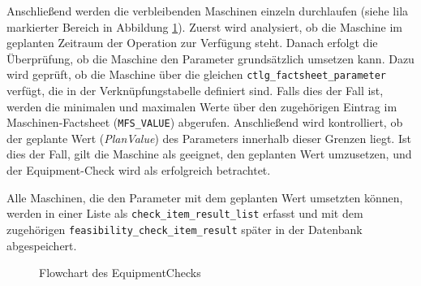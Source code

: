 Anschließend werden die verbleibenden Maschinen einzeln durchlaufen (siehe lila markierter Bereich in Abbildung \ref{fig:equipment-check}). Zuerst wird analysiert, ob die Maschine im geplanten Zeitraum der Operation zur Verfügung steht. Danach erfolgt die Überprüfung, ob die Maschine den Parameter grundsätzlich umsetzen kann. Dazu wird geprüft, ob die Maschine über die gleichen \texttt{ctlg\_factsheet\_parameter} verfügt, die in der Verknüpfungstabelle definiert sind. Falls dies der Fall ist, werden die minimalen und maximalen Werte über den zugehörigen Eintrag im Maschinen-Factsheet (\texttt{MFS\_VALUE}) abgerufen. Anschließend wird kontrolliert, ob der geplante Wert (\textit{PlanValue}) des Parameters innerhalb dieser Grenzen liegt. Ist dies der Fall, gilt die Maschine als geeignet, den geplanten Wert umzusetzen, und der Equipment-Check wird als erfolgreich betrachtet.

Alle Maschinen, die den Parameter mit dem geplanten Wert umsetzten können, werden in einer Liste als \texttt{check\_item\_result\_list} erfasst und mit dem zugehörigen \texttt{feasibility\_check\_item\_result} später in der Datenbank abgespeichert. 

\begin{figure}[!htbp]
    \centering
    \caption{Flowchart des \gls{EquipmentCheck}s}
    \label{fig:equipment-check}
\end{figure}